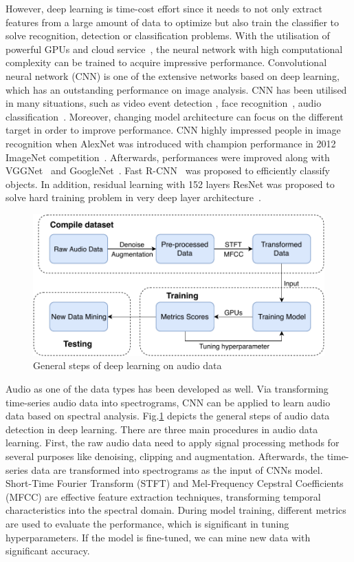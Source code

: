 However, deep learning is time-cost effort since it needs to not only extract features from a large amount of data to optimize but also train the classifier to solve recognition, detection or classification problems. With the utilisation of powerful GPUs and cloud service~\cite{bao2018scalable}, the neural network with high computational complexity can be trained to acquire impressive performance. Convolutional neural network (CNN) is one of the extensive networks based on deep learning, which has an outstanding performance on image analysis. CNN has been utilised in many situations, such as video event detection \cite{xu2015discriminative}, face recognition~\cite{parkhi2015deep}, audio classification~\cite{lee2009unsupervised}. Moreover, changing model architecture can focus on the different target in order to improve performance. CNN highly impressed people in image recognition when AlexNet was introduced with champion performance in 2012 ImageNet competition~\cite{krizhevsky2012imagenet}. Afterwards, performances were improved along with VGGNet~\cite{simonyan2014very} and GoogleNet~\cite{43022}. Fast R-CNN~\cite{girshick2015fast} was proposed to efficiently classify objects. In addition, residual learning with 152 layers ResNet was proposed to solve hard training problem in very deep layer architecture~\cite{he2016deep}.\par
\begin{figure}[htp]
  \centering
  \includegraphics[scale=1]{Figs/intro/pipline.pdf}
  \caption{General steps of deep learning on audio data}
  \label{Fig:pipline}
\end{figure}
Audio as one of the data types has been developed as well. Via transforming time-series audio data into spectrograms, CNN can be applied to learn audio data based on spectral analysis. Fig.\ref{Fig:pipline} depicts the general steps of audio data detection in deep learning. There are three main procedures in audio data learning. First, the raw audio data need to apply signal processing methods for several purposes like denoising, clipping and augmentation. Afterwards, the time-series data are transformed into spectrograms as the input of CNNs model. Short-Time Fourier Transform (STFT) and Mel-Frequency Cepstral Coefficients (MFCC) are effective feature extraction techniques, transforming temporal characteristics into the spectral domain. During model training, different metrics are used to evaluate the performance, which is significant in tuning hyperparameters. If the model is fine-tuned, we can mine new data with significant accuracy. 

